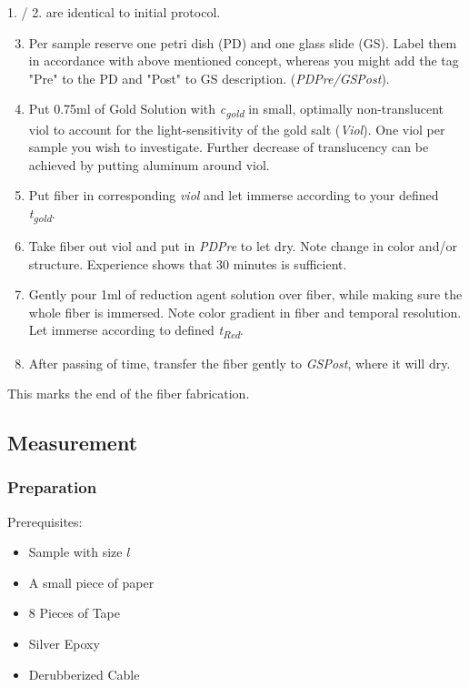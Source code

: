 1. / 2. are identical to initial protocol.

\begin{enumerate}
\setcounter{enumi}{2}
    
    \item Per sample reserve one petri dish (PD) and one glass slide (GS). Label them in accordance with above mentioned concept, whereas you might add the tag "Pre" to the PD and "Post" to GS description. (\textit{PDPre/GSPost}).
    
    \item Put 0.75ml of Gold Solution with \textit{c\textsubscript{gold}} in small, optimally non-translucent viol to account for the light-sensitivity of the gold salt (\textit{Viol}). One viol per sample you wish to investigate. Further decrease of translucency can be achieved by putting aluminum around viol.
    
    \item Put fiber in corresponding \textit{viol} and let immerse according to your defined \textit{t\textsubscript{gold}}.
    \item Take fiber out viol and put in \textit{PDPre} to let dry. Note change in color and/or structure. Experience shows that 30 minutes is sufficient.
    
    \item Gently pour 1ml of reduction agent solution over fiber, while making sure the whole fiber is immersed. Note color gradient in fiber and temporal resolution. Let immerse according to defined \textit{t\textsubscript{Red}}.
    
    \item After passing of time, transfer the fiber gently to \textit{GSPost}, where it will dry.
    \end{enumerate}
    
    \begin{center}
        This marks the end of the fiber fabrication.
    \end{center}

\subsection{Measurement}

\subsubsection{Preparation}
Prerequisites:
\begin{multicols}{2}
\begin{itemize}
    \item Sample with size $l$
    \item A small piece of paper
    \item 8 Pieces of Tape
    \item Silver Epoxy
    \item Derubberized Cable
\end{itemize}
\end{multicols}

